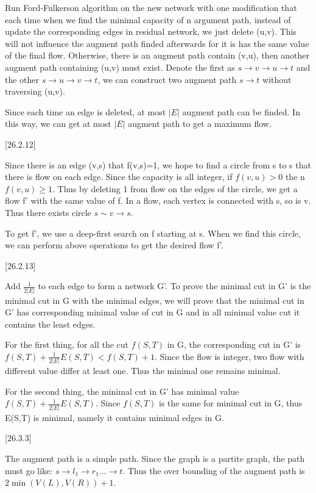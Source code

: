 \documentclass[language=english]{njurepo}
\begin{document}
    Run Ford-Fulkerson algorithm on the new network with one modification that each time when we find the minimal capacity of n argument path, instead of update the corresponding edges in residual network, we just delete (u,v). This will not influence the augment path finded afterwards for it is has the same value of the final flow. Otherwise, there is an augment path contain (v,u), then another augment path containing (u,v) must exist. Denote the first as $s\rightarrow v\rightarrow u \rightarrow t$ and the other $s\rightarrow u\rightarrow v\rightarrow t$, we can construct two augment path $s\rightarrow t$ without traversing (u,v).

    Since each time an edge is deleted, at most $|E|$ augment path can be finded. In this way, we can get at most $|E|$ augment path to get a maximum flow.
  

 [26.2.12]
 
  
    Since there is an edge (v,s) that f(v,s)=1, we hope to find a circle from s to s that there is flow on each edge. Since the capacity is all integer, if $f(v,u)>0$ the n$f(v,u)\geq 1$. Thus by deleting 1 from flow on the edges of the circle, we get a flow f' with the same value of f. In a flow, each vertex is connected with s, so is v. Thus there exists circle $s\sim v\rightarrow s$.

    To get f', we use a deep-first search on f starting at s. When we find this circle, we can perform above operations to get the desired flow f'.
  

 [26.2.13]
 
  
    Add $\frac{1}{2|E|}$ to each edge to form a network G'. To prove the minimal cut in G' is the minimal cut in G with the minimal edges, we will prove that the minimal cut in G' has corresponding minimal value of cut in G and in all minimal value cut it contains the least edges.

    For the first thing, for all the cut $f(S,T)$ in G, the corresponding cut in G' is $f(S,T)+\frac{1}{2|E|}E(S,T)<f(S,T)+1$. Since the flow is integer, two flow with different value differ at least one. Thus the minimal one remains minimal.

    For the second thing, the minimal cut in G' has minimal value $f(S,T)+\frac{1}{2|E|}E(S,T)$. Since $f(S,T)$ is the same for minimal cut in G, thus E(S,T) is minimal, namely it contains minimal edges in G.
  

 [26.3.3]
 
  
    The augment path is a simple path. Since the graph is a partite graph, the path must go like: $s\rightarrow l_1\rightarrow r_1\dots \rightarrow t$. Thus the over bounding of the augment path is $2\min{(V(L),V(R))}+1$.
  
\end{document}
